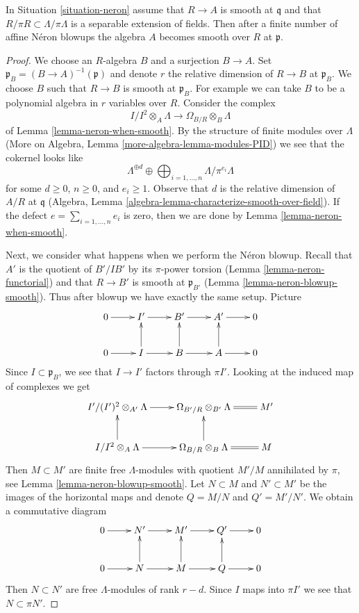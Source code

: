 \begin{lemma}
\label{lemma-neron-desingularization}
In Situation \ref{situation-neron}
assume that $R \to A$ is smooth at $\mathfrak q$
and that $R/\pi R \subset \Lambda/\pi \Lambda$ is a separable
extension of fields. Then after a finite number of affine N\'eron
blowups the algebra $A$ becomes smooth over $R$ at $\mathfrak p$.
\end{lemma}

\begin{proof}
We choose an $R$-algebra $B$ and a surjection $B \to A$. Set
$\mathfrak p_B = (B \to A)^{-1}(\mathfrak p)$ and denote $r$
the relative dimension of $R \to B$ at $\mathfrak p_B$. We choose $B$
such that $R \to B$ is smooth at $\mathfrak p_B$.
For example we can take $B$ to be a polynomial algebra in $r$ variables
over $R$. Consider the complex
$$
I/I^2 \otimes_A \Lambda \longrightarrow \Omega_{B/R} \otimes_B \Lambda
$$
of Lemma \ref{lemma-neron-when-smooth}. By the structure of finite modules
over $\Lambda$ (More on Algebra, Lemma \ref{more-algebra-lemma-modules-PID})
we see that the cokernel looks like
$$
\Lambda^{\oplus d} \oplus
\bigoplus\nolimits_{i = 1, \ldots, n} \Lambda/\pi^{e_i} \Lambda
$$
for some $d \geq 0$, $n \geq 0$, and $e_i \geq 1$. Observe that $d$
is the relative dimension of $A/R$ at $\mathfrak q$
(Algebra, Lemma \ref{algebra-lemma-characterize-smooth-over-field}).
If the defect $e = \sum_{i = 1, \ldots, n} e_i$ is zero, then we are done by
Lemma \ref{lemma-neron-when-smooth}.

\medskip\noindent
Next, we consider what happens when we perform the N\'eron blowup.
Recall that $A'$ is the quotient of $B'/IB'$ by its $\pi$-power
torsion (Lemma \ref{lemma-neron-functorial}) and that $R \to B'$ is smooth at
$\mathfrak p_{B'}$ (Lemma \ref{lemma-neron-blowup-smooth}).
Thus after blowup we have exactly the same setup. Picture
$$
\xymatrix{
0 \ar[r] & I' \ar[r] & B' \ar[r] & A' \ar[r] & 0 \\
0 \ar[r] & I \ar[u] \ar[r] & B \ar[u] \ar[r] & A \ar[r] \ar[u] & 0
}
$$
Since $I \subset \mathfrak p_B$, we see that $I \to I'$
factors through $\pi I'$. Looking at the induced map of
complexes we get
$$
\xymatrix{
I'/(I')^2 \otimes_{A'} \Lambda \ar[r] &
\Omega_{B'/R} \otimes_{B'} \Lambda \ar@{=}[r] & M' \\
I/I^2 \otimes_A \Lambda \ar[r] \ar[u] &
\Omega_{B/R} \otimes_B \Lambda \ar[u] \ar@{=}[r] & M
}
$$
Then $M \subset M'$ are finite free $\Lambda$-modules with quotient
$M'/M$ annihilated by $\pi$, see Lemma \ref{lemma-neron-blowup-smooth}.
Let $N \subset M$ and $N' \subset M'$ be the images of the horizontal
maps and denote $Q = M/N$ and $Q' = M'/N'$.
We obtain a commutative diagram
$$
\xymatrix{
0 \ar[r] &
N' \ar[r] &
M' \ar[r] &
Q' \ar[r] &
0 \\
0 \ar[r] &
N \ar[r] \ar[u] &
M \ar[r] \ar[u] &
Q \ar[r] \ar[u] &
0
}
$$
Then $N \subset N'$ are free $\Lambda$-modules of rank $r - d$.
Since $I$ maps into $\pi I'$ we see that $N \subset \pi N'$.


\end{proof}
